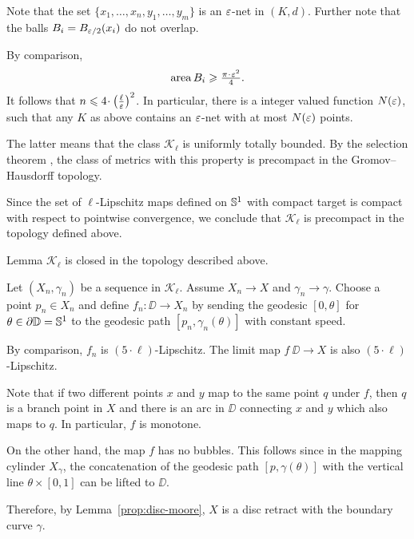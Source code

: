 Note that the set $\{x_1,\dots,x_n,y_1,\dots,y_m\}$
is an $\varepsilon$-net in $(K,d)$.
Further note that the balls $B_i=B_{\varepsilon/2}(x_i)$
do not overlap.

By comparison,
\[\area B_i\ge \tfrac{\pi\cdot\eps^2}{4}.\]
It follows that $n\le 4\cdot\left(\tfrac\ell\eps\right)^2$.
In particular, there is a integer valued function $N(\varepsilon)$, such that any  
$K$ as above contains an $\varepsilon$-net
with at most $N(\varepsilon)$ points.

The latter means that the class $\mathcal{K}_\ell$ is uniformly totally bounded.
By the selection theorem \cite[7.4.15]{BBI}, the class of metrics with this property is precompact in the Gromov--Hausdorff topology.

Since the set of $\ell$-Lipschitz maps defined on $\mathbb{S}^1$ with compact target is compact 
with respect to pointwise convergence, we conclude that $\mathcal{K}_\ell$ is precompact in the topology defined above. 
\qeds





\begin{thm}{Lemma}\label{lem:closed}
$\mathcal{K}_\ell$ is closed in the topology described above.
\end{thm}

Let $(X_n,\gamma_n)$ be a sequence in $\mathcal{K}_\ell$.
Assume $X_n\to X$ and $\gamma_n\to\gamma$. 
Choose a point $p_n\in X_n$ and define
$f_n:\DD\to X_n$ by sending the geodesic $[0,\theta]$ for $\theta\in\partial \mathbb{D}=\mathbb{S}^1$ to the geodesic path $[p_n,\gamma_n(\theta)]$ with constant speed. 

By comparison, $f_n$ is $(5\cdot\ell)$-Lipschitz. %
The limit map $f\:\DD\to X$ is also $(5\cdot\ell)$-Lipschitz.

Note that if two different points $x$  and $y$ map to the same point $q$ under $f$, then $q$ is a branch point in $X$ 
and there is an arc in $\DD$ connecting 
$x$ and $y$ which also maps to $q$. 
In particular, $f$ is monotone.

On the other hand, the map $f$ has no bubbles.
This follows since in the mapping cylinder $X_\gamma$, the concatenation of the geodesic path $[p,\gamma(\theta)]$ 
with the vertical line $\theta\times [0,1]$ can be lifted to $\DD$.

Therefore, by Lemma~\ref{prop:disc-moore}, $X$ is a disc retract with the boundary curve $\gamma$.
\qeds
